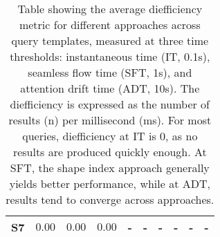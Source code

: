 \begin{table}[h]
{\begin{tabular}{|c|c|c|c||c|c|c||c|c|c|}
        \hline
        S7 & $\boldsymbol{0.00}$ & $\boldsymbol{0.00}$ & $\boldsymbol{0.00}$ & - & - & - & - & - & - \\
        \hline
    \end{tabular}
    }
    \caption{Table showing the average diefficiency metric for different approaches across query templates, measured at three time thresholds: instantaneous time (IT, 0.1s), seamless flow time (SFT, 1s), and attention drift time (ADT, 10s).
    The diefficiency is expressed as the number of results (n) per millisecond (ms). For most queries, diefficiency at IT is 0, as no results are produced quickly enough. At SFT, the shape index approach generally yields better performance, while at ADT, results tend to converge across approaches.}
	\label{tab:dief}
\end{table}
    